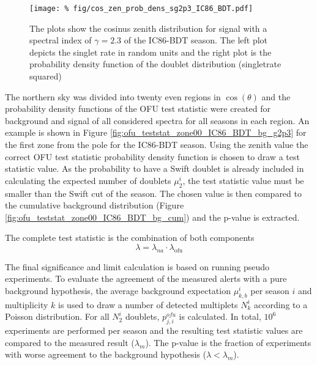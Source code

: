 \begin{figure}[h]
\centering
 \captionsetup{width=.85\textwidth}
\texttt{[image: \%
fig/cos\_zen\_prob\_dens\_sg2p3\_IC86\_BDT.pdf]}
\caption{The plots show the cosinus zenith distribution for signal with a 
spectral index of $\gamma=2.3$ of the 
IC86-BDT season. The left plot depicts the singlet rate in random units and the 
right plot is the probability density function of the doublet distribution 
(singletrate squared)}
\label{fig:cos_zen_prob_dens_sg2p3_IC86_BDT}
\end{figure}
The northern sky was divided 
into twenty even regions in $\cos(\theta)$ and the probability density 
functions of the OFU test statistic were created for background and signal of 
all considered spectra for all seasons in each region. An example is shown 
in Figure \ref{fig:ofu_teststat_zone00_IC86_BDT_bg_g2p3} for the first zone 
from the pole for the IC86-BDT season. Using the zenith value the correct OFU 
test statistic probability density function is chosen to draw a test statistic 
value. As the probability to have a Swift doublet is already included in 
calculating the expected number of doublets $\mu_{2}^i$, the test statistic 
value must be smaller than the Swift cut of the season. The chosen value is 
then compared to the cumulative background distribution (Figure 
\ref{fig:ofu_teststat_zone00_IC86_BDT_bg_cum}) and the p-value is extracted.

\begin{figure}[h]
\centering
 \captionsetup{width=.4\textwidth}
\end{figure}

The complete test statistic is the combination of both components
\begin{equation}
\label{eq:lam_total}
 \lambda = \lambda_{na} \cdot \lambda_\text{ofu}
\end{equation}


The final significance and limit calculation is based on running pseudo 
experiments. To evaluate the 
agreement of the measured alerts with a pure background hypothesis, the average 
background expectation $\mu_{k, b}^i$
per season $i$ and multiplicity $k$  is used to draw a number of 
detected multiplets $N_k^i$ according to a Poisson distribution. 
For all $N_2^i$ doublets, $p_{j,i}^{ofu}$ is calculated. 
In total, 
$10^6$ experiments are performed per season and the resulting 
 test statistic values are compared to the measured result ($\lambda_m$). The 
p-value is the fraction of experiments with worse agreement to the background 
hypothesis ($\lambda < \lambda_m$).


